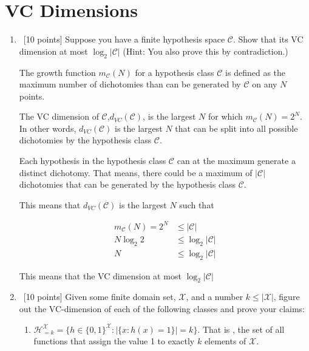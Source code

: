 \section{VC Dimensions}
\label{sec:vc-dimension}
\begin{enumerate}
\item ~[10 points] Suppose you have a finite hypothesis space
  $\mathcal{C}$. Show that its VC dimension at most
  $\log_2|\mathcal{C}|$ (Hint: You also prove this by contradiction.)

The growth function $m_\mathcal{C}(N)$ for a hypothesis class $\mathcal{C}$ is defined as the maximum number of dichotomies than can be generated by $\mathcal{C}$ on any $N$ points. 

The VC dimension of $\mathcal{C}$,$d_{VC}(\mathcal{C})$, is the largest $N$ for which $m_\mathcal{C}(N)=2^N$. In other words, $d_{VC}(\mathcal{C})$ is the largest $N$ that can be split into all possible dichotomies by the hypothesis class $\mathcal{C}$.

Each hypothesis in the hypothesis class $\mathcal{C}$ can at the maximum generate a distinct dichotomy. That means, there could be a maximum of $\left | \mathcal{C} \right| $ dichotomies that can be generated by the hypothesis class $\mathcal{C}$.

This means that $d_{VC}(\mathcal{C})$ is the largest $N$ such that 

\begin{equation*}
\begin{aligned}
m_\mathcal{C}(N)=2^N &\leq \left | \mathcal{C} \right| \\
N \log_2 2 &\leq \log_2 \left | \mathcal{C} \right| \\
N &\leq \log_2|\mathcal{C}|
\end{aligned}
\end{equation*}

This means that the VC dimension at most $\log_2|\mathcal{C}|$

\item ~[10 points] Given some finite domain set, $\mathcal{X}$, and a
  number $k \leq |\mathcal{X}|$, figure out the VC-dimension of each
  of the following classes and prove your claims:

  \begin{enumerate}
  \item
    $\mathcal{H}_{=k}^{\mathcal{X}} = \{h \in \{0,1\}^\mathcal{X} :
    |\{x : h(x) = 1\} | = k \}$. That is , the set of all functions that
    assign the value 1 to exactly $k$ elements of $\mathcal{X}$.


\end{enumerate}
\end{enumerate}
